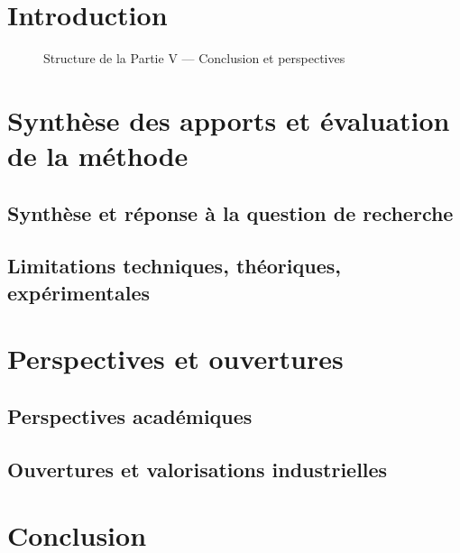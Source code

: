 \documentclass[ twoside,openright,titlepage,numbers=noenddot,headinclude,%
                footinclude=true,cleardoublepage=empty,abstractoff, %
                BCOR=5mm,paper=a4,fontsize=11pt,%
                french,american,%
                ]{scrreprt}
\begin{document}
\chapter*{Introduction}


\begin{figure}[h!]
    \centering
    
    \caption{Structure de la Partie V — Conclusion et perspectives}
\end{figure}

\chapter{Synthèse des apports et évaluation de la méthode}

\section{Synthèse et réponse à la question de recherche}

\section{Limitations techniques, théoriques, expérimentales}

\chapter{Perspectives et ouvertures}
\section{Perspectives académiques}
\section{Ouvertures et valorisations industrielles}

\chapter*{Conclusion}


\cleardoublepage
{}
{}
\end{document}

